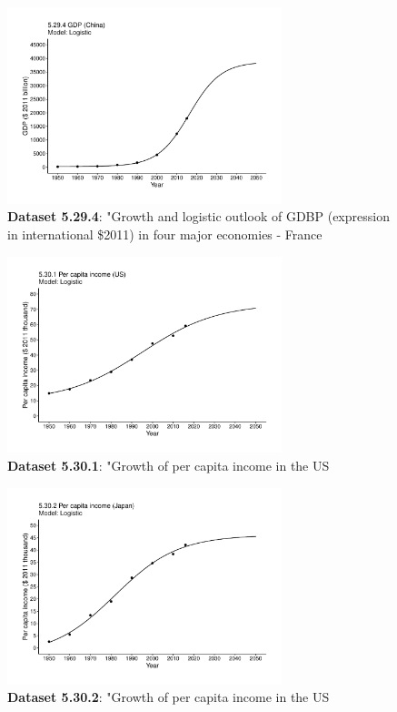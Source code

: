 \documentclass[aps,rmp,preprint,superscriptaddress,10pt,onecolumn]{article}
\begin{document}
\begin{figure}[h]
\includegraphics[width=8cm]{output/figs-ggplot/5.29.4.pdf}
\caption{\textbf{Dataset 5.29.4}: "Growth and logistic outlook of GDBP (expression in international \$2011) in four major economies - France}
\end{figure}
	
\begin{figure}[h]
\includegraphics[width=8cm]{output/figs-ggplot/5.30.1.pdf}
\caption{\textbf{Dataset 5.30.1}: "Growth of per capita income in the US}
\end{figure}
	
\begin{figure}[h]
\includegraphics[width=8cm]{output/figs-ggplot/5.30.2.pdf}
\caption{\textbf{Dataset 5.30.2}: "Growth of per capita income in the US}
\end{figure}
	
\end{document}
